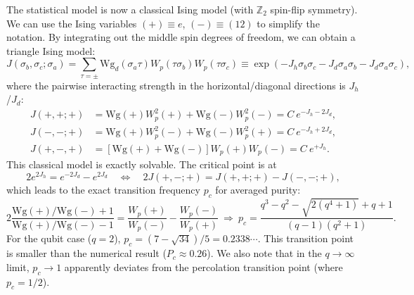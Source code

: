 \documentclass{SciPost}
\begin{document}
The statistical model is now a classical Ising model (with $\mathbb Z_2$ spin-flip symmetry).
We can use the Ising variables $(+) \equiv e$, $(-) \equiv (12)$ to simplify the notation.
By integrating out the middle spin degrees of freedom, we can obtain a triangle Ising model:
\begin{equation}
	J\left(\sigma_b, \sigma_c ; \sigma_a\right)
	= \sum_{\tau=\pm} \mathrm{Wg}_d\left(\sigma_a \tau\right) W_p(\tau\sigma_b) W_p(\tau\sigma_c)
	\equiv \exp\left(-J_h\sigma_b\sigma_c-J_d \sigma_a\sigma_b-J_d \sigma_a\sigma_c\right),
\end{equation}
where the pairwise interacting strength in the horizontal/diagonal directions is $J_h$/$J_d$:
\begin{equation}
\begin{aligned}
	J(+,+;+) &= \mathrm{Wg}(+) W^2_p(+) + \mathrm{Wg}(-) W^2_p(-) = C\ e^{-J_h-2J_d}, \\
	J(-,-;+) &= \mathrm{Wg}(+) W^2_p(-) + \mathrm{Wg}(-) W^2_p(+) = C\ e^{-J_h+2J_d}, \\
	J(+,-,+) &= \left[\mathrm{Wg}(+) + \mathrm{Wg}(-)\right] W_p(+) W_p(-) = C\ e^{+J_h}.
\end{aligned}
\end{equation}
This classical model is exactly solvable.
The critical point is at
\begin{equation}
	2 e^{2J_h} = e^{-2J_d} - e^{2J_d}
	\quad \Longleftrightarrow \quad
	2J(+,-;+) = J(+,+;+) - J(-,-;+),
\end{equation}
which leads to the exact transition frequency $p_c$ for averaged purity:
\begin{equation}
	2\frac{\mathrm{Wg}(+)/\mathrm{Wg}(-)+1}{\mathrm{Wg}(+)/\mathrm{Wg}(-)-1} = \frac{W_p(+)}{W_p(-)} - \frac{W_p(-)}{W_p(+)} 
	\ \Longrightarrow \
	p_c = \frac{q^3-q^2-\sqrt{2(q^4+1)}+q+1}{(q-1) \left(q^2+1\right)}.
\end{equation}
For the qubit case ($q=2$), $p_c = (7-\sqrt{34})/5 = 0.2338\cdots$.
This transition point is smaller than the numerical result ($P_c\approx 0.26$).
We also note that in the $q\rightarrow \infty$ limit, $p_c \rightarrow 1$ apparently deviates from the percolation transition point (where $p_c=1/2$).
\end{document}
